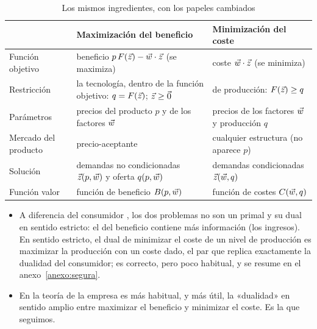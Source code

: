 \documentclass[11pt]{article}
\begin{document}
\begin{table}[H]
\centering\small
\caption{Los mismos ingredientes, con los papeles cambiados}\label{tab:ingredientes}
\renewcommand{\arraystretch}{1.3}
\begin{tabular}{|>{\raggedright\arraybackslash}p{}|>{\raggedright\arraybackslash}p{}|>{\raggedright\arraybackslash}p{}|}
\hline
\rowcolor{tceeazulpalido} & \textbf{Maximización del beneficio} & \textbf{Minimización del coste}\\
\hline
Función objetivo & beneficio $p\,F(\vec{z})-\vec{w}\cdot\vec{z}$ (se maximiza) & coste $\vec{w}\cdot\vec{z}$ (se minimiza)\\
\hline
Restricción & la tecnología, dentro de la función objetivo: $q=F(\vec{z})$; $\vec{z}\geq\vec{0}$ & de producción: $F(\vec{z})\geq q$\\
\hline
Parámetros & precios del producto $p$ y de los factores $\vec{w}$ & precios de los factores $\vec{w}$ y producción $q$\\
\hline
Mercado del producto & precio-aceptante & cualquier estructura (no aparece $p$)\\
\hline
Solución & demandas no condicionadas $\vec{z}(p,\vec{w})$ y oferta $q(p,\vec{w})$ & demandas condicionadas $\vec{z}(\vec{w},q)$\\
\hline
Función valor & función de beneficio $B(p,\vec{w})$ & función de costes $C(\vec{w},q)$\\
\hline
\end{tabular}
\end{table}

\begin{itemize}
\item A diferencia del consumidor , los dos problemas no son un primal y su dual en sentido estricto: el del beneficio contiene más información (los ingresos). En sentido estricto, el dual de minimizar el coste de un nivel de producción es maximizar la producción con un coste dado, el par que replica exactamente la dualidad del consumidor\nocite{Segura1986Analisis}; es correcto, pero poco habitual, y se resume en el anexo~\ref{anexo:segura}.
\item En la teoría de la empresa es más habitual, y más útil, la «dualidad» en sentido amplio entre maximizar el beneficio y minimizar el coste. Es la que seguimos.
\end{itemize}
\end{document}
